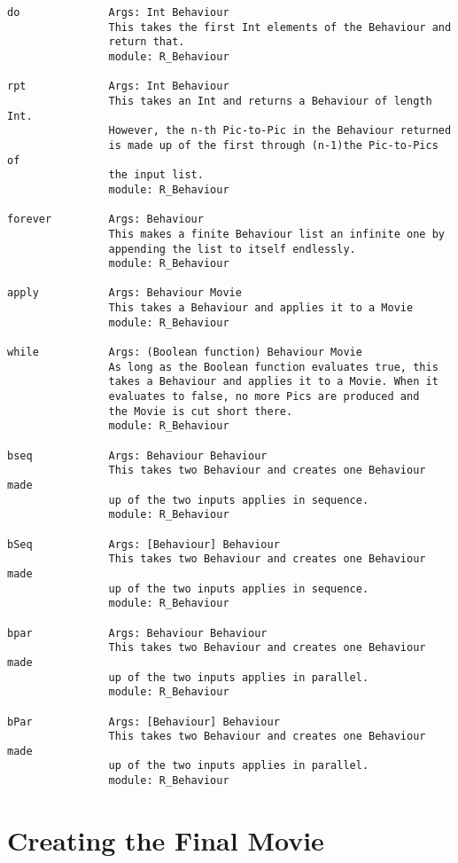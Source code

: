 \begin{verbatim}
do              Args: Int Behaviour
                This takes the first Int elements of the Behaviour and
                return that.
                module: R_Behaviour

rpt             Args: Int Behaviour
                This takes an Int and returns a Behaviour of length Int.
                However, the n-th Pic-to-Pic in the Behaviour returned
                is made up of the first through (n-1)the Pic-to-Pics of
                the input list.
                module: R_Behaviour

forever         Args: Behaviour
                This makes a finite Behaviour list an infinite one by
                appending the list to itself endlessly.
                module: R_Behaviour

apply           Args: Behaviour Movie
                This takes a Behaviour and applies it to a Movie
                module: R_Behaviour

while           Args: (Boolean function) Behaviour Movie
                As long as the Boolean function evaluates true, this 
                takes a Behaviour and applies it to a Movie. When it
                evaluates to false, no more Pics are produced and
                the Movie is cut short there.
                module: R_Behaviour

bseq            Args: Behaviour Behaviour
                This takes two Behaviour and creates one Behaviour made
                up of the two inputs applies in sequence.
                module: R_Behaviour

bSeq            Args: [Behaviour] Behaviour
                This takes two Behaviour and creates one Behaviour made
                up of the two inputs applies in sequence.
                module: R_Behaviour

bpar            Args: Behaviour Behaviour
                This takes two Behaviour and creates one Behaviour made
                up of the two inputs applies in parallel.
                module: R_Behaviour

bPar            Args: [Behaviour] Behaviour
                This takes two Behaviour and creates one Behaviour made
                up of the two inputs applies in parallel.
                module: R_Behaviour
\end{verbatim}

\section{Creating the Final Movie}

